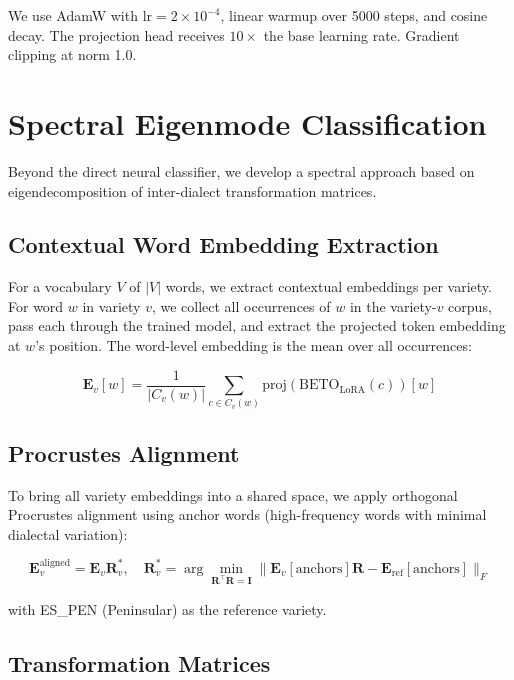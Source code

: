 \documentclass[11pt,a4paper]{article}
\newcommand{\bE}{\mathbf{E}}
\newcommand{\bI}{\mathbf{I}}
\begin{document}
We use AdamW with $\text{lr} = 2 \times 10^{-4}$, linear warmup over 5000
steps, and cosine decay. The projection head receives $10\times$ the base
learning rate. Gradient clipping at norm 1.0.

\section{Spectral Eigenmode Classification}

Beyond the direct neural classifier, we develop a spectral approach based on
eigendecomposition of inter-dialect transformation matrices.

\subsection{Contextual Word Embedding Extraction}

For a vocabulary $V$ of $|V|$ words, we extract contextual embeddings per
variety. For word $w$ in variety $v$, we collect all occurrences of $w$ in
the variety-$v$ corpus, pass each through the trained model, and extract the
projected token embedding at $w$'s position. The word-level embedding is the
mean over all occurrences:

\begin{equation}
    \bE_v[w] = \frac{1}{|C_v(w)|} \sum_{c \in C_v(w)}
    \text{proj}(\text{BETO}_{\text{LoRA}}(c))[w]
\end{equation}

\subsection{Procrustes Alignment}

To bring all variety embeddings into a shared space, we apply orthogonal
Procrustes alignment \citep{schonemann1966generalized} using anchor words
(high-frequency words with minimal dialectal variation):

\begin{equation}
    \bE_v^{\text{aligned}} = \bE_v \mathbf{R}_v^*, \quad
    \mathbf{R}_v^* = \arg\min_{\mathbf{R}^\top \mathbf{R} = \bI}
    \|\bE_v[\text{anchors}] \mathbf{R} - \bE_{\text{ref}}[\text{anchors}]\|_F
\end{equation}

with ES\_PEN (Peninsular) as the reference variety.

\subsection{Transformation Matrices}
\end{document}
